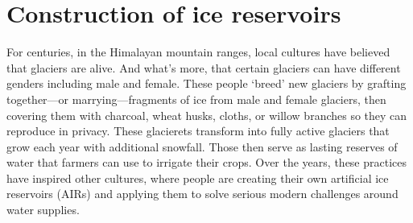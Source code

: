 \chapter{Construction of ice reservoirs}

For centuries, in the Himalayan mountain ranges, local cultures have believed that glaciers are alive. And
what’s more, that certain glaciers can have different genders including male and female. These people ‘breed’
new glaciers by grafting together—or marrying—fragments of ice from male and female glaciers, then covering them
with charcoal, wheat husks, cloths, or willow branches so they can reproduce in privacy. These glacierets
transform into fully active glaciers that grow each year with additional snowfall. Those then serve as lasting
reserves of water that farmers can use to irrigate their crops. Over the years, these practices have inspired
other cultures, where people are creating their own artificial ice reservoirs (AIRs) and applying them to solve
serious modern challenges around water supplies.
